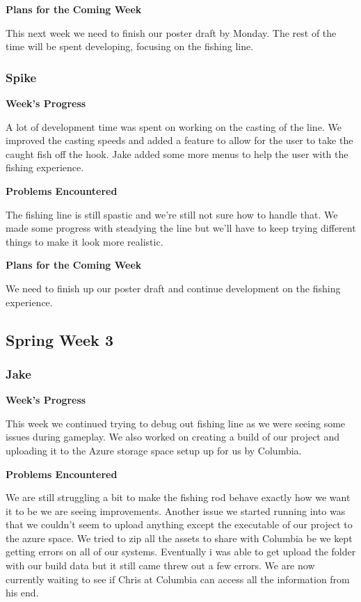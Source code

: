 \documentclass[10pt,journal,compsoc,onecolumn, draftclsnofoot]{IEEEtran}
\begin{document}
\noindent \textbf{Plans for the Coming Week}

This next week we need to finish our poster draft by Monday. The rest of the time will be spent developing, focusing on the fishing line.

\subsubsection{Spike}
\noindent \textbf{Week's Progress}

A lot of development time was spent on working on the casting of the line. We improved the casting speeds and added a feature to allow for the user to take the caught fish off the hook. Jake added some more menus to help the user with the fishing experience.

\noindent \textbf{Problems Encountered}

The fishing line is still spastic and we're still not sure how to handle that. We made some progress with steadying the line but we'll have to keep trying different things to make it look more realistic.

\noindent \textbf{Plans for the Coming Week}

We need to finish up our poster draft and continue development on the fishing experience.

\subsection{Spring Week 3}
\subsubsection{Jake}
\noindent \textbf{Week's Progress}

This week we continued trying to debug out fishing line as we were seeing some issues during gameplay. We also worked on creating a build of our project and uploading it to the Azure storage space setup up for us by Columbia.

\noindent \textbf{Problems Encountered}

We are still struggling a bit to make the fishing rod behave exactly how we want it to be we are seeing improvements. Another issue we started running into was that we couldn't seem to upload anything except the executable of our project to the azure space. We tried to zip all the assets to share with Columbia be we kept getting errors on all of our systems. Eventually i was able to get upload the folder with our build data but it still came threw out a few errors. We are now currently waiting to see if Chris at Columbia can access all the information from his end.
\end{document}
